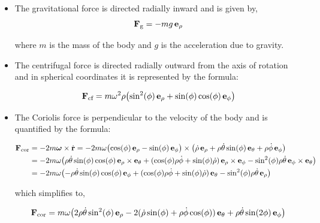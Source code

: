 \documentclass[12pt]{article}
\begin{document}
\begin{itemize}
  \item The gravitational force is directed radially inward and is given by,
  \[
    \vb{F}_\text{g} = -mg\,\vb{e}_\rho
  \]

  where $m$ is the mass of the body and $g$ is the acceleration due to gravity.

  \item The centrifugal force is directed radially outward from the axis of rotation and in
        spherical coordinates it is represented by the formula:

  \begin{equation}
    \vb{F}_\text{cf} = m\omega^2\rho\bigl(\sin^2(\phi)\,\vb{e}_\rho
      + \sin(\phi)\cos(\phi)\,\vb{e}_\phi\bigr)
    \label{earth:centrifugal-force-spherical}
  \end{equation}

  \item The Coriolis force is perpendicular to the velocity of the body and is quantified by
        the formula:

  \begin{align}
    \vb{F}_\text{cor}
    &= -2m\boldsymbol{\omega}\times\dot{\vb{r}}
     = -2m\omega\bigl(\cos(\phi)\,\vb{e}_\rho - \sin(\phi)\,\vb{e}_\phi\bigr)
       \times\bigl(\dot\rho\,\vb{e}_\rho + \rho\dot\theta\sin(\phi)\,\vb{e}_\theta + \rho\dot\phi\,\vb{e}_\phi\bigr) \nonumber \\
    &= -2m\omega\bigl(\rho\dot\theta\sin(\phi)\cos(\phi)\,\vb{e}_\rho\times\vb{e}_\theta
       + (\cos(\phi)\rho\dot\phi + \sin(\phi)\dot\rho)\,\vb{e}_\rho\times\vb{e}_\phi
       - \sin^2(\phi)\rho\dot\theta\,\vb{e}_\phi\times\vb{e}_\theta\bigr) \nonumber \\
    &= -2m\omega\bigl(-\rho\dot\theta\sin(\phi)\cos(\phi)\,\vb{e}_\phi
       + (\cos(\phi)\rho\dot\phi + \sin(\phi)\dot\rho)\,\vb{e}_\theta
       - \sin^2(\phi)\rho\dot\theta\,\vb{e}_\rho\bigr)
  \end{align}

  which simplifies to,

  \begin{equation}
    \vb{F}_\text{cor} = m\omega\bigl(
      2\rho\dot\theta\sin^2(\phi)\,\vb{e}_\rho
      - 2(\dot\rho\sin(\phi) + \rho\dot\phi\cos(\phi))\,\vb{e}_\theta
      + \rho\dot\theta\sin(2\phi)\,\vb{e}_\phi\bigr)
    \label{earth:coriolis-force-spherical}
  \end{equation}
\end{itemize}
\end{document}
